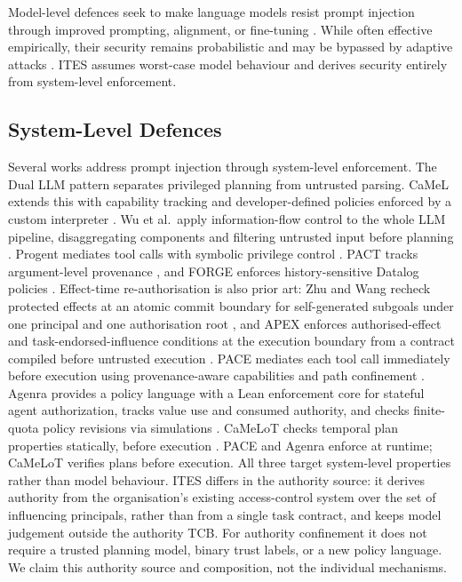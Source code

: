 \documentclass[11pt]{article}
\begin{document}
Model-level defences seek to make language models resist prompt injection
through improved prompting, alignment, or fine-tuning
\citep{struq,spotlighting,secalign,datasentinel}. While often effective
empirically, their security remains probabilistic and may be bypassed by
adaptive attacks \citep{criticaleval,checkpointgcg,poisoningalignment}. ITES
assumes worst-case model behaviour and derives security entirely from
system-level enforcement.

\subsection{System-Level Defences}

Several works address prompt injection through system-level enforcement.
The Dual LLM pattern separates privileged planning from untrusted parsing.
CaMeL extends this with capability tracking and developer-defined policies
enforced by a custom interpreter \citep{camel,designpatterns}. Wu et al.\
apply information-flow control to the whole LLM pipeline, disaggregating
components and filtering untrusted input before planning \citep{ifcdefense}.
Progent mediates tool calls with symbolic privilege control \citep{progent}. PACT
tracks argument-level provenance \citep{pact}, and FORGE enforces
history-sensitive Datalog policies \citep{forge}. Effect-time re-authorisation
is also prior art: Zhu and Wang recheck protected effects at an atomic commit
boundary for self-generated subgoals under one principal and one authorisation
root \citep{zhu2026runtime}, and APEX enforces authorised-effect and
task-endorsed-influence conditions at the execution boundary from a contract
compiled before untrusted execution \citep{zheng2026apex}. PACE mediates each
tool call immediately before execution using provenance-aware capabilities and
path confinement \citep{pace}. Agenra provides a policy language with a Lean
enforcement core for stateful agent authorization, tracks value use and
consumed authority, and checks finite-quota policy revisions via simulations
\citep{agenra}. CaMeLoT checks temporal plan properties statically, before
execution \citep{camelot}. PACE and Agenra enforce at runtime; CaMeLoT verifies
plans before execution. All three target system-level properties rather than
model behaviour. ITES differs in the authority source: it derives authority from the organisation's existing
access-control system over the set of influencing principals, rather than from
a single task contract, and keeps model judgement outside the authority TCB.
For authority confinement it does not require a trusted planning model, binary
trust labels, or a new policy language. We claim this authority source and
composition, not the individual mechanisms.
\end{document}
